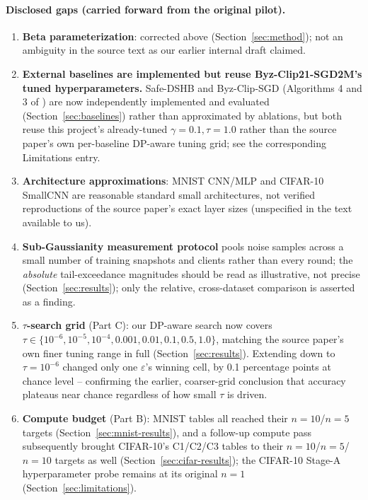 \documentclass{article}
\begin{document}
\paragraph{Disclosed gaps (carried forward from the original pilot).}
\begin{enumerate}
\item \textbf{Beta parameterization}: corrected above (Section~\ref{sec:method});
  not an ambiguity in the source text as our earlier internal draft claimed.
\item \textbf{External baselines are implemented but reuse Byz-Clip21-SGD2M's
  tuned hyperparameters.} Safe-DSHB and Byz-Clip-SGD (Algorithms 4 and 3 of
  \citealt{islamov2026byzclip}) are now independently implemented and
  evaluated (Section~\ref{sec:baselines}) rather than approximated by
  ablations, but both reuse this project's already-tuned $\gamma{=}0.1,
  \tau{=}1.0$ rather than the source paper's own per-baseline DP-aware tuning
  grid; see the corresponding Limitations entry.
\item \textbf{Architecture approximations}: MNIST CNN/MLP and CIFAR-10 SmallCNN
  are reasonable standard small architectures, not verified reproductions of the
  source paper's exact layer sizes (unspecified in the text available to us).
\item \textbf{Sub-Gaussianity measurement protocol} pools noise samples across a
  small number of training snapshots and clients rather than every round; the
  \emph{absolute} tail-exceedance magnitudes should be read as illustrative, not
  precise (Section~\ref{sec:results}); only the relative, cross-dataset
  comparison is asserted as a finding.
\item \textbf{$\tau$-search grid} (Part C): our DP-aware search now covers
  $\tau\in\{10^{-6},10^{-5},10^{-4},0.001,0.01,0.1,0.5,1.0\}$, matching the
  source paper's own finer tuning range in full (Section~\ref{sec:results}).
  Extending down to $\tau=10^{-6}$ changed only one $\varepsilon$'s winning
  cell, by 0.1 percentage points at chance level -- confirming the earlier,
  coarser-grid conclusion that accuracy plateaus near chance regardless of how
  small $\tau$ is driven.
\item \textbf{Compute budget} (Part B): MNIST tables all reached their
  $n{=}10$/$n{=}5$ targets (Section~\ref{sec:mnist-results}), and a follow-up
  compute pass subsequently brought CIFAR-10's C1/C2/C3 tables to their
  $n{=}10$/$n{=}5$/$n{=}10$ targets as well (Section~\ref{sec:cifar-results});
  the CIFAR-10 Stage-A hyperparameter probe remains at its original $n{=}1$
  (Section~\ref{sec:limitations}).
\end{enumerate}
\end{document}
